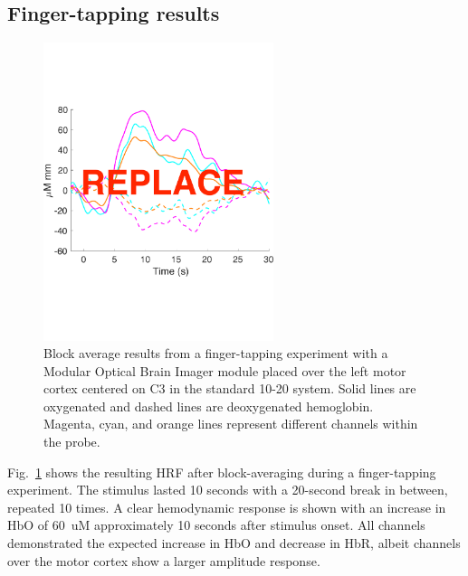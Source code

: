 \subsection{Finger-tapping results}
\begin{figure}
	\begin{center}
	\includegraphics[width=0.6\textwidth]{fig/mobi/hrf_fingertapping.pdf}
	\end{center}
	\caption{Block average results from a finger-tapping experiment with a Modular Optical Brain Imager module placed over the left motor cortex centered on C3 in the standard 10-20 system. Solid lines are oxygenated and dashed lines are deoxygenated hemoglobin. Magenta, cyan, and orange lines represent different channels within the probe.}
	\label{fig:hrf}
\end{figure} 
Fig.~\ref{fig:hrf} shows the resulting \ac{HRF} after block-averaging during a finger-tapping experiment. The stimulus lasted 10 seconds with a 20-second break in between, repeated 10 times. A clear hemodynamic response is shown with an increase in \ac{HbO} of 60~uM approximately 10 seconds after stimulus onset. All channels demonstrated the expected increase in \ac{HbO} and decrease in \ac{HbR}, albeit channels over the motor cortex show a larger amplitude response. 



